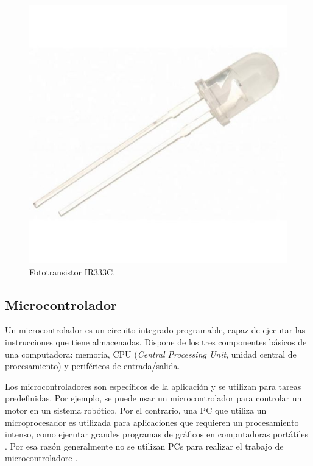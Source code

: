 	\begin{figure}[h]
		\centering
		\includegraphics[scale=0.27]{./Figures/phototransistor.jpg}
		\caption{Fototransistor IR333C\protect\footnotemark.}
		\label{fig:cuadradoAzul}
	\end{figure}


\subsection{Microcontrolador}

Un microcontrolador es un circuito integrado programable, capaz de ejecutar las instrucciones que tiene almacenadas. Dispone de los tres componentes básicos de una computadora: memoria, CPU (\textit{Central Processing Unit}, unidad central de procesamiento) y periféricos de entrada/salida. 

Los microcontroladores son específicos de la aplicación y se utilizan para tareas predefinidas. Por ejemplo, se puede usar un microcontrolador para controlar un motor en un sistema robótico. Por el contrario, una PC que utiliza un microprocesador es utilizada para aplicaciones que requieren un procesamiento intenso, como ejecutar grandes programas de gráficos en computadoras portátiles \citep{WEBSITE:22} . Por esa razón generalmente no se utilizan PCs para realizar el trabajo de microcontroladore .

